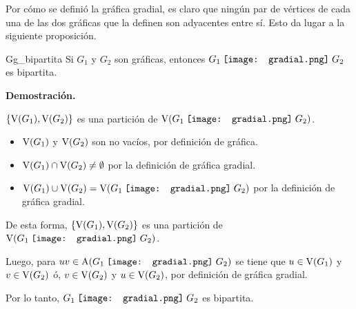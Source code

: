 \documentclass[fleqn, 11pt]{beamer}
\newcommand{\gradial}{\hspace{0.9mm} \texttt{[image: gradial.png]} \hspace{1mm}}
\begin{document}
    Por cómo se definió la gráfica gradial, es claro que ningún par de vértices de cada una de las dos gráficas que la definen son adyacentes entre sí. Esto da lugar a la siguiente proposición.

    \begin{proposicion}[beforeafter skip = 4mm]{}{Gg_bipartita}
        Si $ G_1 $ y $ G_2 $ son gráficas, entonces $ G_1 \gradial G_2 $ es bipartita. 

        \tcblower

        \textbf{Demostración.} \vspace{3mm}

        \begin{list}{\bfseries Afirmación.}{ \addtolength{\itemindent}{-5mm}%
            \addtolength{\labelsep}{0mm}%
            \addtolength{\leftmargin}{-5mm}%
            \addtolength{\labelwidth}{-1cm} }
            \item $ \left\lbrace \textnormal{V}(G_1), \textnormal{V}(G_2) \right\rbrace $ es una partición de $ \textnormal{V}(G_1 \gradial G_2) $. \vspace{2mm}
            
            \begin{itemize}
                \item $ \textnormal{V}(G_1) $ y $ \textnormal{V}(G_2) $ son no vacíos, por definición de gráfica. 
                \item $ \textnormal{V}(G_1) \cap \textnormal{V}(G_2) \neq \emptyset $ por la definición de gráfica gradial.
                \item $ \textnormal{V}(G_1) \cup \textnormal{V}(G_2) = \textnormal{V}(G_1 \gradial G_2) $ por la definición de gráfica gradial.
            \end{itemize} \vspace{2mm}

            De esta forma, $ \left\lbrace \textnormal{V}(G_1), \textnormal{V}(G_2) \right\rbrace $ es una partición de $ \textnormal{V}(G_1 \gradial G_2) $. 
        \end{list} \vspace{2mm}

        Luego, para $ uv \in \textnormal{A}(G_1 \gradial G_2) $ se tiene que $ u \in \textnormal{V}(G_1) $ y $ v \in \textnormal{V}(G_2) $ ó, $ v \in \textnormal{V}(G_2) $ y $ u \in \textnormal{V}(G_2) $, por definición de gráfica gradial. \vspace{2mm}

        Por lo tanto, $ G_1 \gradial G_2 $ es bipartita.
    \end{proposicion}
\end{document}
